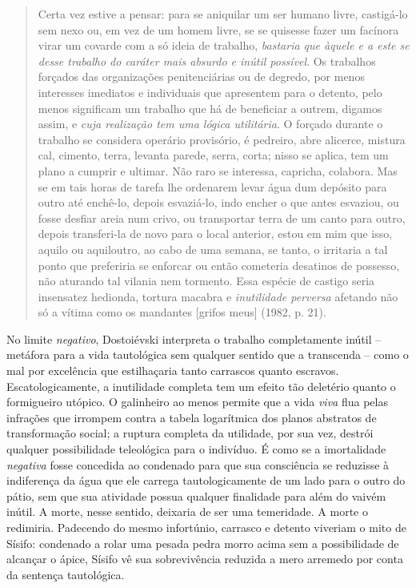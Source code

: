 \begin{quote}
Certa vez estive a pensar: para se aniquilar um ser humano livre,
castigá-lo sem nexo ou, em vez de um homem livre, se se quisesse fazer
um facínora virar um covarde com a só ideia de trabalho, \emph{bastaria
que àquele e a este se desse trabalho do caráter mais absurdo e inútil
possível}. Os trabalhos forçados das organizações penitenciárias ou de
degredo, por menos interesses imediatos e individuais que apresentem
para o detento, pelo menos significam um trabalho que há de beneficiar a
outrem, digamos assim, e \emph{cuja realização tem uma lógica
utilitária}. O forçado durante o trabalho se considera operário
provisório, é pedreiro, abre alicerce, mistura cal, cimento, terra,
levanta parede, serra, corta; nisso se aplica, tem um plano a cumprir e
ultimar. Não raro se interessa, capricha, colabora. Mas se em tais horas
de tarefa lhe ordenarem levar água dum depósito para outro até enchê-lo,
depois esvaziá-lo, indo encher o que antes esvaziou, ou fosse desfiar
areia num crivo, ou transportar terra de um canto para outro, depois
transferi-la de novo para o local anterior, estou em mim que isso,
aquilo ou aquiloutro, ao cabo de uma semana, se tanto, o irritaria a tal
ponto que preferiria se enforcar ou então cometeria desatinos de
possesso, não aturando tal vilania nem tormento. Essa espécie de castigo
seria insensatez hedionda, tortura macabra e \emph{inutilidade perversa}
afetando não só a vítima como os mandantes {[}grifos meus{]} (1982, p.
21).
\end{quote}

No limite \emph{negativo}, Dostoiévski interpreta o trabalho
completamente inútil -- metáfora para a vida tautológica sem qualquer
sentido que a transcenda -- como o mal por excelência que estilhaçaria
tanto carrascos quanto escravos. Escatologicamente, a inutilidade
completa tem um efeito tão deletério quanto o formigueiro utópico. O
galinheiro ao menos permite que a vida \emph{viva} flua pelas infrações
que irrompem contra a tabela logarítmica dos planos abstratos de
transformação social; a ruptura completa da utilidade, por sua vez,
destrói qualquer possibilidade teleológica para o indivíduo. É como se a
imortalidade \emph{negativa} fosse concedida ao condenado para que sua
consciência se reduzisse à indiferença da água que ele carrega
tautologicamente de um lado para o outro do pátio, sem que sua atividade
possua qualquer finalidade para além do vaivém inútil. A morte, nesse
sentido, deixaria de ser uma temeridade. A morte o redimiria. Padecendo
do mesmo infortúnio, carrasco e detento viveriam o mito de Sísifo:
condenado a rolar uma pesada pedra morro acima sem a possibilidade de
alcançar o ápice, Sísifo vê sua sobrevivência reduzida a mero arremedo
por conta da sentença tautológica.

